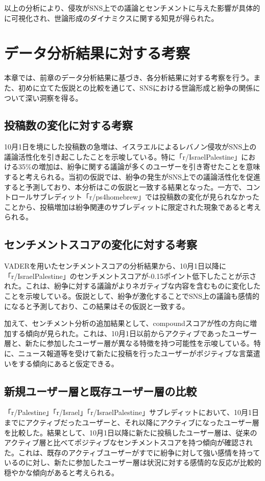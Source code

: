 \documentclass[11pt, a4j]{jreport}
\begin{document}
    以上の分析により、侵攻がSNS上での議論とセンチメントに与えた影響が具体的に可視化され、世論形成のダイナミクスに関する知見が得られた。

    \chapter{データ分析結果に対する考察}

    本章では、前章のデータ分析結果に基づき、各分析結果に対する考察を行う。また、初めに立てた仮説との比較を通じて、SNSにおける世論形成と紛争の関係について深い洞察を得る。

    \section{投稿数の変化に対する考察}
    10月1日を境にした投稿数の急増は、イスラエルによるレバノン侵攻がSNS上の議論活性化を引き起こしたことを示唆している。特に「r/IsraelPalestine」における35\%の増加は、紛争に関する議論が多くのユーザーを引き寄せたことを意味すると考えられる。当初の仮説では、紛争の発生がSNS上での議論活性化を促進すると予測しており、本分析はこの仮説と一致する結果となった。一方で、コントロールサブレディット「r/ps4homebrew」では投稿数の変化が見られなかったことから、投稿増加は紛争関連のサブレディットに限定された現象であると考えられる。

    \section{センチメントスコアの変化に対する考察}
    VADERを用いたセンチメントスコアの分析結果から、10月1日以降に「r/IsraelPalestine」のセンチメントスコアが-0.15ポイント低下したことが示された。これは、紛争に対する議論がよりネガティブな内容を含むものに変化したことを示唆している。仮説として、紛争が激化することでSNS上の議論も感情的になると予測しており、この結果はその仮説と一致する。

    加えて、センチメント分析の追加結果として、compoundスコアが性の方向に増加する傾向が見られた。これは、10月1日以前からアクティブであったユーザー層と、新たに参加したユーザー層が異なる特徴を持つ可能性を示唆している。特に、ニュース報道等を受けて新たに投稿を行ったユーザーがポジティブな言葉遣いをする傾向にあると仮定できる。

    \section{新規ユーザー層と既存ユーザー層の比較}
    「r/Palestine」「r/Israel」「r/IsraelPalestine」サブレディットにおいて、10月1日までにアクティブだったユーザーと、それ以降にアクティブになったユーザー層を比較した。結果として、10月1日以降に新たに投稿したユーザー層は、従来のアクティブ層と比べてポジティブなセンチメントスコアを持つ傾向が確認された。これは、既存のアクティブユーザーがすでに紛争に対して強い感情を持っているのに対し、新たに参加したユーザー層は状況に対する感情的な反応が比較的穏やかな傾向があると考えられる。
\end{document}
